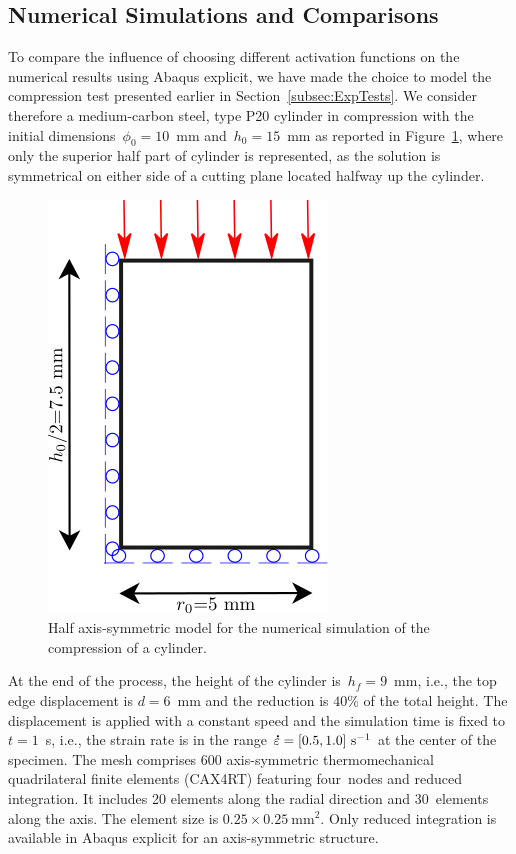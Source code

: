 \documentclass[algorithms,article,accept,pdftex,oneauthor]{Definitions/mdpi}
\makeatletter
\DeclareRobustCommand{\mdot}[1]{\accentset{\mbox{\bfseries .}}{#1}}
\DeclareRobustCommand{\ie}{i.e.,\@\xspace}
\DeclareRobustCommand{\ps}{\text{s}^{-1}}
\makeatother
\begin{document}
\subsection{Numerical Simulations and Comparisons}\label{subsec:Num-sim}

To compare the influence of choosing different activation functions on the numerical results using Abaqus explicit, we have made the choice to model the compression test presented earlier in Section~\ref{subsec:ExpTests}.
We consider therefore a medium-carbon steel, type P20 cylinder in compression with the initial dimensions~$\phi_{0}=10$~mm and~$h_{0}=15$~mm as reported in Figure~\ref{fig:Num-model}, where only the superior half part of cylinder is represented, as the solution is symmetrical on either side of a cutting plane located halfway up the cylinder.
\begin{figure}[H]
\includegraphics[width=0.25\columnwidth]{Figures/CyCompression}
\caption{Half %
 axis-symmetric model for the numerical simulation of the compression of a cylinder.}
\label{fig:Num-model}
\end{figure}
At the end of the process, the height of the cylinder is~$h_f=9$~mm, \ie the top edge displacement is $d=6$~mm and the reduction is $40\%$ of the total height.
The displacement is applied with a constant speed and the simulation time is fixed to $t=1$~s, \ie the strain rate is in the range $\mdot{\varepsilon}=[0.5,1.0]~\ps$ at the center of the specimen.
The mesh comprises 600 axis-symmetric thermomechanical quadrilateral finite elements (CAX4RT) featuring four~nodes and reduced integration.
It includes 20 elements along the radial direction and 30~elements along the axis.
The element size is $0.25\times0.25~\text{mm}^2$.
Only reduced integration is available in Abaqus explicit for an axis-symmetric structure.
\end{document}
